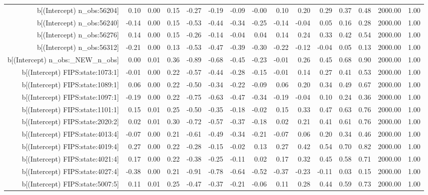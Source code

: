 \begin{table}[ht]
\begin{tabular}{rrrrrrrrrrrrrrr}
  b[(Intercept) n\_obs:56204] & 0.10 & 0.00 & 0.15 & -0.27 & -0.19 & -0.09 & -0.00 & 0.10 & 0.20 & 0.29 & 0.37 & 0.48 & 2000.00 & 1.00 \\ 
  b[(Intercept) n\_obs:56240] & -0.14 & 0.00 & 0.15 & -0.53 & -0.44 & -0.34 & -0.25 & -0.14 & -0.04 & 0.05 & 0.16 & 0.28 & 2000.00 & 1.00 \\ 
  b[(Intercept) n\_obs:56276] & 0.14 & 0.00 & 0.15 & -0.26 & -0.14 & -0.04 & 0.04 & 0.14 & 0.24 & 0.33 & 0.42 & 0.54 & 2000.00 & 1.00 \\ 
  b[(Intercept) n\_obs:56312] & -0.21 & 0.00 & 0.13 & -0.53 & -0.47 & -0.39 & -0.30 & -0.22 & -0.12 & -0.04 & 0.05 & 0.13 & 2000.00 & 1.00 \\ 
  b[(Intercept) n\_obs:\_NEW\_n\_obs] & 0.00 & 0.01 & 0.36 & -0.89 & -0.68 & -0.45 & -0.23 & -0.01 & 0.26 & 0.45 & 0.68 & 0.90 & 2000.00 & 1.00 \\ 
  b[(Intercept) FIPS:state:1073:1] & -0.01 & 0.00 & 0.22 & -0.57 & -0.44 & -0.28 & -0.15 & -0.01 & 0.14 & 0.27 & 0.41 & 0.53 & 2000.00 & 1.00 \\ 
  b[(Intercept) FIPS:state:1089:1] & 0.06 & 0.00 & 0.22 & -0.50 & -0.34 & -0.22 & -0.09 & 0.06 & 0.20 & 0.34 & 0.49 & 0.67 & 2000.00 & 1.00 \\ 
  b[(Intercept) FIPS:state:1097:1] & -0.19 & 0.00 & 0.22 & -0.75 & -0.63 & -0.47 & -0.34 & -0.19 & -0.04 & 0.10 & 0.24 & 0.36 & 2000.00 & 1.00 \\ 
  b[(Intercept) FIPS:state:1101:1] & 0.15 & 0.01 & 0.25 & -0.50 & -0.35 & -0.18 & -0.02 & 0.15 & 0.33 & 0.47 & 0.63 & 0.76 & 2000.00 & 1.00 \\ 
  b[(Intercept) FIPS:state:2020:2] & 0.02 & 0.01 & 0.30 & -0.72 & -0.57 & -0.37 & -0.18 & 0.02 & 0.21 & 0.41 & 0.61 & 0.76 & 2000.00 & 1.00 \\ 
  b[(Intercept) FIPS:state:4013:4] & -0.07 & 0.00 & 0.21 & -0.61 & -0.49 & -0.34 & -0.21 & -0.07 & 0.06 & 0.20 & 0.34 & 0.46 & 2000.00 & 1.00 \\ 
  b[(Intercept) FIPS:state:4019:4] & 0.27 & 0.00 & 0.22 & -0.28 & -0.15 & -0.02 & 0.13 & 0.27 & 0.42 & 0.54 & 0.70 & 0.82 & 2000.00 & 1.00 \\ 
  b[(Intercept) FIPS:state:4021:4] & 0.17 & 0.00 & 0.22 & -0.38 & -0.25 & -0.11 & 0.02 & 0.17 & 0.32 & 0.45 & 0.58 & 0.71 & 2000.00 & 1.00 \\ 
  b[(Intercept) FIPS:state:4027:4] & -0.38 & 0.00 & 0.21 & -0.91 & -0.78 & -0.64 & -0.52 & -0.37 & -0.23 & -0.11 & 0.03 & 0.15 & 2000.00 & 1.00 \\ 
  b[(Intercept) FIPS:state:5007:5] & 0.11 & 0.01 & 0.25 & -0.47 & -0.37 & -0.21 & -0.06 & 0.11 & 0.28 & 0.44 & 0.59 & 0.73 & 2000.00 & 1.00 \\ 

\end{tabular}
\end{table}
